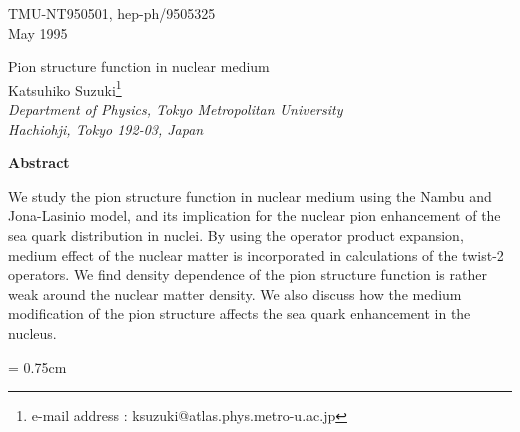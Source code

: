 \begin{titlepage}
%
\begin{flushright}{TMU-NT950501, hep-ph/9505325
\\May 1995}
\end{flushright}
\vspace {0.2cm}
%
%
\baselineskip=1cm
\begin{center}{\fontb Pion structure function in nuclear medium} \\
\vspace {3.1cm}
{\fontc Katsuhiko Suzuki\footnote{e-mail address :
ksuzuki@atlas.phys.metro-u.ac.jp}}\\
{\em Department of Physics, Tokyo Metropolitan University}\\
{\em Hachiohji, Tokyo 192-03, Japan}

\vspace {2.2cm}
{\bf Abstract}
\end{center}
%
\vspace {0.5cm}

\baselineskip=0.8cm
\noindent
We study the pion structure function in nuclear medium using the
Nambu and Jona-Lasinio model, and its
implication for the nuclear pion enhancement of the sea quark
distribution in nuclei.
By using the operator product expansion, medium effect of the nuclear
matter is incorporated in calculations of the twist-2 operators.
We find density dependence of the pion structure function is
rather weak around the nuclear matter density.
We also discuss how the medium modification of the pion structure
affects the sea quark enhancement in the nucleus.

\vspace{0.3cm}

\end{titlepage}


\newpage
\baselineskip = 0.75cm

